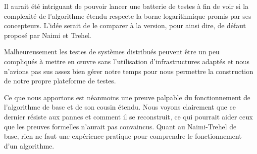 Il aurait été intriguant de pouvoir lancer une batterie de testes à fin de voir si la complexité de l'algorithme étendu respecte la borne logarithmique promis par ses concepteurs. L'idée serait de le comparer à la version, pour ainsi dire, \og de défaut \fg{} proposé par Naimi et Trehel. 

Malheureusement les testes de systèmes distribués peuvent être un peu compliqués à mettre en œuvre sans l'utilisation d'infrastructures adaptés et nous n'avions pas sus assez bien gérer notre temps pour nous permettre la construction de notre propre plateforme de testes.

Ce que nous apportons est néanmoins une preuve palpable du fonctionnement de l'algorithme de base et de son cousin étendu. Nous voyons clairement que ce dernier résiste aux pannes et comment il se reconstruit, ce qui pourrait aider ceux que les preuves formelles n'aurait pas convaincus. Quant au Naimi-Trehel de base, rien ne faut une expérience pratique pour comprendre le fonctionnement d'un algorithme. 